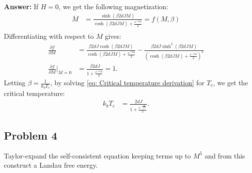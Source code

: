 \documentclass[a4paper]{article}
\newcommand{\newparagraph}{\vspace{.5cm}\noindent}
\newcommand{\fpartial}[2]{\frac{\partial #1}{\partial #2}}
\begin{document}
\newparagraph
\textbf{Answer:} If $H = 0$, we get the following magnetization:
\begin{align*}
    M&= \frac{\sinh(\beta 2dJM)}{\cosh(\beta 2dJM) + \frac{e^{-\beta \Delta}}{2}} = f(M, \beta)\\
\end{align*}Differentiating with respect to $M$ gives:
\begin{align}
    \fpartial{f}{M} &= \frac{\beta 2 d J\cosh\left(\beta 2 d J M \right)}{\cosh\left(\beta 2 d J M\right) + \frac{e^{-\beta \Delta}}{2}} - \frac{\beta 2 d J\sinh^2\left(\beta 2 d J M\right)}{\left(\cosh\left(\beta 2 d J M\right) + \frac{e^{-\beta \Delta}}{2}\right)^2}\nonumber\\
    \fpartial{f}{M}\Big|_{M= 0} &= \frac{\beta 2 d J}{1 + \frac{e^{-\beta \Delta}}{2}} = 1\label{eq: Critical temperature derivation}.
\end{align}Letting $\beta = \frac{1}{k_bT_c}$, by solving \eqref{eq: Critical temperature derivation} for $T_c$, we get the critical temperature:
\begin{align*}
    k_bT_c &= \frac{2d J}{1 + \frac{e^{-\frac{\Delta}{k_bT_c}}}{2}}.
\end{align*}


\subsection*{Problem 4}
Taylor-expand the self-consistent equation keeping terms up to $M^5$ and from this construct a Landau free energy.
\end{document}
